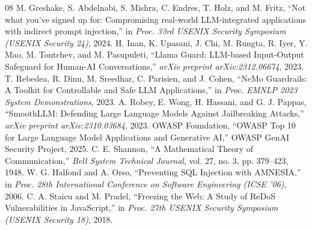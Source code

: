 \documentclass[conference]{IEEEtran}
\begin{document}

\begin{thebibliography}{08}
 M. Greshake, S. Abdelnabi, S. Mishra, C. Endres, T. Holz, and M. Fritz, ``Not what you've signed up for: Compromising real-world LLM-integrated applications with indirect prompt injection,'' in \textit{Proc. 33rd USENIX Security Symposium (USENIX Security 24)}, 2024.
 H. Inan, K. Upasani, J. Chi, M. Rungta, R. Iyer, Y. Mao, M. Tontchev, and M. Pasupuleti, ``Llama Guard: LLM-based Input-Output Safeguard for Human-AI Conversations,'' \textit{arXiv preprint arXiv:2312.06674}, 2023.
 T. Rebedea, R. Dinu, M. Sreedhar, C. Parisien, and J. Cohen, ``NeMo Guardrails: A Toolkit for Controllable and Safe LLM Applications,'' in \textit{Proc. EMNLP 2023 System Demonstrations}, 2023.
 A. Robey, E. Wong, H. Hassani, and G. J. Pappas, ``SmoothLLM: Defending Large Language Models Against Jailbreaking Attacks,'' \textit{arXiv preprint arXiv:2310.03684}, 2023.
 OWASP Foundation, ``OWASP Top 10 for Large Language Model Applications and Generative AI,'' OWASP GenAI Security Project, 2025.
 C. E. Shannon, ``A Mathematical Theory of Communication,'' \textit{Bell System Technical Journal}, vol. 27, no. 3, pp. 379--423, 1948.
 W. G. Halfond and A. Orso, ``Preventing SQL Injection with AMNESIA,'' in \textit{Proc. 28th International Conference on Software Engineering (ICSE '06)}, 2006.
 C. A. Staicu and M. Pradel, ``Freezing the Web: A Study of ReDoS Vulnerabilities in JavaScript,'' in \textit{Proc. 27th USENIX Security Symposium (USENIX Security 18)}, 2018.
\end{thebibliography}
\end{document}
